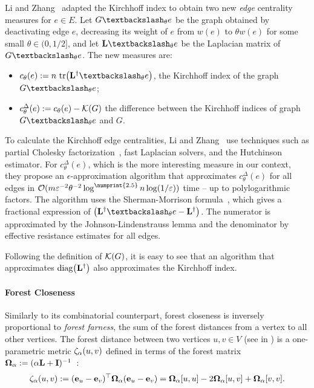 Li and Zhang~\cite{DBLP:conf/soda/LiZ18} adapted the Kirchhoff index to obtain
two new \emph{edge} centrality measures for $e \in E$. Let $G
\textbackslash_{\theta}e$ be the graph obtained by deactivating edge $e$, \ie
decreasing its weight of $e$ from $w(e)$ to $\theta w(e)$ for some small
$\theta \in (0, 1/2]$, and let $\Lapl\textbackslash_{\theta}e$ be the Laplacian
matrix of $G\textbackslash_{\theta}e$. The new measures are:
\begin{itemize}
    \item $c_{\theta}(e) := n\ \tr{\Linv\textbackslash_{\theta}e}$, \ie the
        Kirchhoff index of the graph $G\textbackslash_{\theta}e$;
    \item $c_{\theta}^{\Delta}(e) := c_{\theta}(e) - \mathcal{K}(G)$ \ie the
        difference between the Kirchhoff indices of graph
        $G\textbackslash_{\theta}e$ and $G$.
\end{itemize}

To calculate the Kirchhoff edge centralities, Li and
Zhang~\cite{DBLP:conf/soda/LiZ18} use techniques such as partial Cholesky
factorization~\cite{DBLP:conf/focs/KyngS16}, fast Laplacian solvers, and the
Hutchinson estimator. For $c_{\theta}^{\Delta}(e)$, which is the more
interesting measure in our context, they propose an $\epsilon$-approximation
algorithm that approximates $c_{\theta}^{\Delta}(e)$ for all edges in
$\Oh(m\epsilon^{-2}\theta^{-2}\log^{\numprint{2.5}}n\log(1/\epsilon))$ time --
up to polylogarithmic factors. The algorithm uses the Sherman-Morrison
formula~\cite{sherman1950adjustment}, which gives a fractional expression of
$\roundb{\Linv\textbackslash_{\theta}e - \Linv}$. The numerator is approximated
by the Johnson-Lindenstrauss lemma and the denominator by effective resistance
estimates for all edges.

Following the definition of $\mathcal{K}(G)$, it is easy to see that
an algorithm that approximates $\diag{\Linv}$ also
approximates the Kirchhoff index.

\paragraph{Forest Closeness}
Similarly to its combinatorial counterpart, forest closeness is inversely
proportional to \emph{forest farness}, \ie the sum of the forest distances
from a vertex to all other vertices. The forest distance between two vertices $u,v\in V$
(see  in ) is a
one-parametric metric $\zeta_{\alpha}(u, v)$ defined in terms of the forest matrix
$\bm{\Omega}_{\alpha} := (\alpha\mathbf{L} + \mathbf{I})^{-1}$~\cite{chebotarev2000forest}:
%
\begin{equation}
\label{eq:el-clos:f-dist}
\zeta_{\alpha}(u, v) := (\mathbf{e}_{u} - \mathbf{e}_{v})^\top \bm{\Omega}_{\alpha} (\mathbf{e}_{u} - \mathbf{e}_{v}) =
\bm{\Omega}_{\alpha}[u,u] - 2\bm{\Omega}_{\alpha}[u,v] + \bm{\Omega}_{\alpha}[v,v].
\end{equation}

